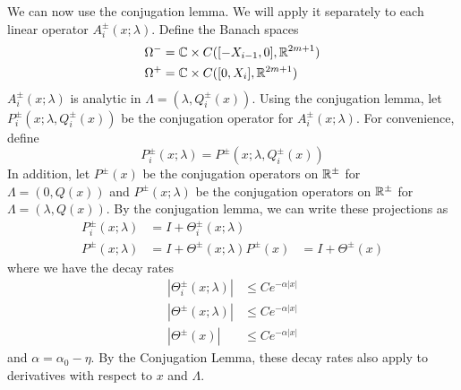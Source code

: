 \documentclass[thesis.tex]{subfiles}
\begin{document}
We can now use the conjugation lemma. We will apply it separately to each linear operator $A_i^\pm(x; \lambda)$. Define the Banach spaces
\begin{align*}
\Omega^- &= \mathbb{C} \times C([-X_{i-1}, 0], \mathbb{R}^{2m+1}) \\
\Omega^+ &= \mathbb{C} \times C([0, X_i], \mathbb{R}^{2m+1})
\end{align*}
$A_i^\pm(x; \lambda)$ is analytic in $\Lambda = (\lambda, Q_i^\pm(x))$. Using the conjugation lemma, let $P_i^\pm(x; \lambda, Q_i^\pm(x) )$ be the conjugation operator for $A_i^\pm(x; \lambda)$. For convenience, define 
\begin{equation}\label{defPipm}
P_i^\pm(x; \lambda) = P^\pm(x; \lambda, Q_i^\pm(x) )
\end{equation}
In addition, let $P^\pm(x)$ be the conjugation operators on $\mathbb{R}^\pm$ for $\Lambda = (0, Q(x))$ and $P^\pm(x; \lambda)$ be the conjugation operators on $\mathbb{R}^\pm$ for $\Lambda = (\lambda, Q(x))$. By the conjugation lemma, we can write these projections as
\begin{equation}\label{projTheta}
\begin{aligned}
P_i^\pm(x; \lambda) &= I + \Theta_i^\pm(x; \lambda) \\
P^\pm(x; \lambda) &= I + \Theta^\pm(x; \lambda)
P^\pm(x) &= I + \Theta^\pm(x)
\end{aligned}
\end{equation}
where we have the decay rates
\begin{equation}\label{Thetadecay}
\begin{aligned}
|\Theta_i^\pm(x; \lambda)| &\leq C e^{-\alpha |x|} \\
|\Theta^\pm(x; \lambda)| &\leq C e^{-\alpha |x|} \\
|\Theta^\pm(x)| &\leq C e^{-\alpha |x|}
\end{aligned}
\end{equation}
and $\alpha = \alpha_0 - \eta$. By the Conjugation Lemma, these decay rates also apply to derivatives with respect to $x$ and $\Lambda$.
\end{document}
